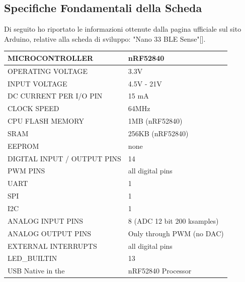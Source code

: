 \subsection{Specifiche Fondamentali della Scheda}
Di seguito ho riportato le informazioni ottenute dalla pagina ufficiale sul sito Arduino, relative alla scheda di sviluppo: "Nano 33 BLE Sense"[].\\
\begin{center} \begin{tabularx}{12,3cm}{|l l|}
\hline
    MICROCONTROLLER & nRF52840\\
    \hline
    OPERATING VOLTAGE & 3.3V\\
    INPUT VOLTAGE & 4.5V - 21V\\
    \hline
    DC CURRENT PER I/O PIN & 15 mA\\
    \hline
    CLOCK SPEED & 64MHz\\
    CPU\citCPU{} FLASH MEMORY & 1MB (nRF52840)\\
    SRAM\citSRAM{} & 256KB (nRF52840)\\
    EEPROM\citEEPROM{} & none\\
    \hline
    DIGITAL INPUT / OUTPUT PINS & 14\\
    PWM\citPWM{} PINS & all digital pins\\
    \hline
    UART\citUART{} & 1\\
    SPI\citSPI{} & 1\\
    I2C\citItwoC{} & 1\\
    \hline
    ANALOG INPUT PINS & 8 (ADC 12 bit 200 ksamples)\\
    ANALOG OUTPUT PINS & Only through PWM (no DAC)\\
    EXTERNAL INTERRUPTS & all digital pins\\
    \hline
    LED\_BUILTIN & 13\\
    \hline
    USB	Native in the & nRF52840 Processor\\
    \hline
\end{tabularx} \end{center}

\newpage{}


